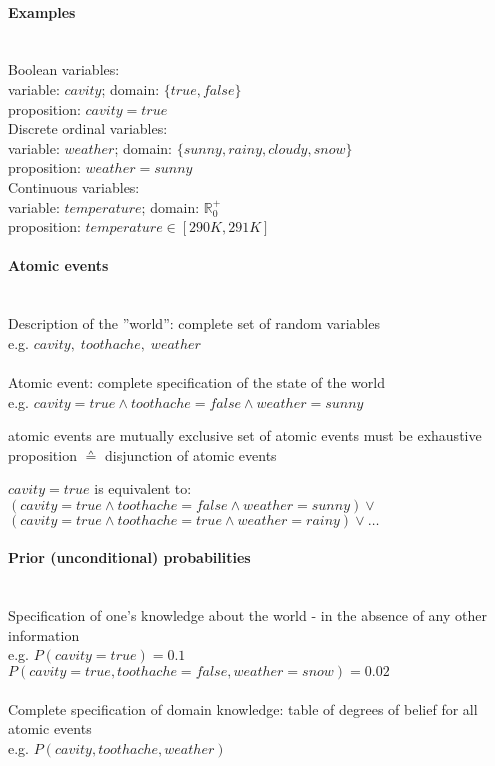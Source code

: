 \paragraph{Examples}\mbox{}\\
Boolean variables:\\
\indent variable: $cavity$; domain: $\{true, false\}$ \\
\indent proposition: $cavity = true$\\
Discrete ordinal variables:\\
\indent variable: $weather$; domain: $\{sunny, rainy, cloudy, snow\}$ \\
\indent proposition: $weather = sunny$ \\
Continuous variables: \\
\indent variable: $temperature$; domain: $\mathbb{R}_0^+$ \\
\indent proposition: $temperature \in [290K, 291K]$
\paragraph{Atomic events}\mbox{}\\
Description of the ''world'': complete set of random variables \\
\indent e.g. $cavity, \; toothache, \; weather$
\\\\
Atomic event: complete specification of the state of the world \\
\indent e.g. $cavity = true \land toothache = false \land weather = sunny$
\begin{itemize}
  \itl atomic events are mutually exclusive
  \itl set of atomic events must be exhaustive
  \itl proposition $\corresponds$ disjunction of atomic events
\end{itemize}
\indent $cavity = true$ is equivalent to: \\
\indent $(cavity = true \land toothache = false \land weather = sunny) \lor$ \\
\indent $(cavity = true \land toothache = true \land weather = rainy) \lor \ldots$ 

\paragraph{Prior (unconditional) probabilities}\mbox{}\\ 
Specification of one's knowledge about the world - in the absence of any other information \\
\indent e.g. $P(cavity=true) = 0.1$ \\
\indent\indent $P(cavity=true,toothache=false,weather=snow) = 0.02$
\\\\
Complete specification of domain knowledge: table of degrees of belief for all atomic events \\
\indent e.g. $P(cavity,toothache,weather)$

